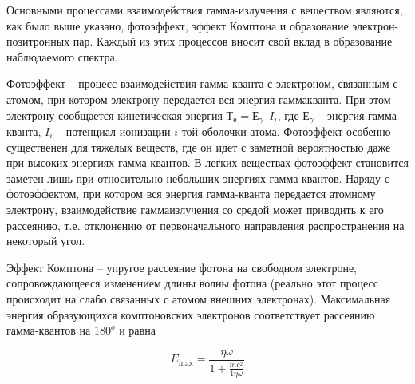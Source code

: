 Основными процессами взаимодействия гамма-излучения с веществом являются, как
было выше указано, фотоэффект, эффект Комптона и образование
электрон-позитронных пар. Каждый из этих процессов вносит свой вклад в
образование наблюдаемого спектра.

Фотоэффект – процесс взаимодействия гамма-кванта с электроном, связанным с
атомом, при котором электрону передается вся энергия гаммакванта. При этом
электрону сообщается кинетическая энергия $Т_е = Е_{\gamma} – I_i$, где
$Е_{\gamma}$ – энергия гамма-кванта, $I_i$ – потенциал ионизации $i$-той
оболочки атома. Фотоэффект особенно существенен для тяжелых веществ, где он идет
с заметной вероятностью даже при высоких энергиях гамма-квантов. В легких
веществах фотоэффект становится заметен лишь при относительно небольших энергиях
гамма-квантов. Наряду с фотоэффектом, при котором вся энергия гамма-кванта
передается атомному электрону, взаимодействие гаммаизлучения со средой может
приводить к его рассеянию, т.е. отклонению от первоначального направления
распространения на некоторый угол.

Эффект Комптона – упругое рассеяние фотона на свободном электроне,
сопровождающееся изменением длины волны фотона (реально этот процесс происходит
на слабо связанных с атомом внешних электронах). Максимальная энергия
образующихся комптоновских электронов соответствует рассеянию гамма-квантов на
$180^o$ и равна

\begin{equation}
  E_{\max} = \frac{\eta \omega}{1 + \frac{m c^2}{1 \eta \omega}}
\end{equation}
